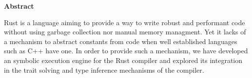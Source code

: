 
\clearemptydoublepage
{}
{}

\vspace*{2cm}
\begin{center}
{\Large \textbf{Abstract}}
\end{center}
\vspace{1cm}

Rust is a language aiming to provide a way to write robust and performant code without using garbage collection nor manual memory managment. Yet it lacks of a mechanism to abstract constants from code when well established languages such as C++ have one. In order to provide such a mechanism, we have developed an symbolic execution engine for the Rust compiler and explored its integration in the trait solving and type inference mechanisms of the compiler.

